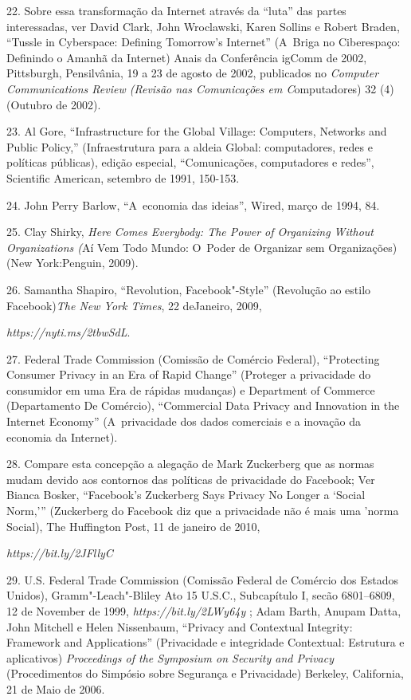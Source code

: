 \begin{Parskip}
22. Sobre essa transformação da Internet através da ``luta'' das partes
interessadas, ver David Clark, John Wroclawski, Karen Sollins e Robert
Braden, ``Tussle in Cyberspace: Defining Tomorrow's Internet'' (A~Briga
no Ciberespaço: Definindo o Amanhã da Internet) Anais da Conferência
igComm de 2002, Pittsburgh, Pensilvânia, 19 a 23 de agosto de 2002,
publicados no \emph{Computer Communications Review (Revisão nas
Comunicações em C}omputadores) 32 (4) (Outubro de 2002).

23. Al Gore, ``Infrastructure for the Global Village: Computers, Networks
and Public Policy,'' (Infraestrutura para a aldeia Global:
computadores, redes e políticas públicas), edição especial,
``Comunicações, computadores e redes'', Scientific American, setembro de
1991, 150-153.

24. John Perry Barlow, ``A~economia das ideias'', Wired, março de 1994, 84.

25. Clay Shirky, \emph{Here Comes Everybody: The Power of Organizing
Without Organizations (}Aí Vem Todo Mundo: O~Poder de Organizar sem
Organizações) (New York:Penguin, 2009).

26. Samantha Shapiro, ``Revolution, Facebook"-Style'' (Revolução ao estilo
Facebook)\emph{The New York Times}, 22 deJaneiro, 2009,

\emph{https://nyti.ms/2tbwSdL}.

27. Federal Trade Commission (Comissão de Comércio Federal), ``Protecting
Consumer Privacy in an Era of Rapid Change'' (Proteger a privacidade do
consumidor em uma Era de rápidas mudanças) e Department of Commerce
(Departamento De Comércio), ``Commercial Data Privacy and Innovation in
the Internet Economy'' (A~privacidade dos dados comerciais e a inovação
da economia da Internet).

28. Compare esta concepção a alegação de Mark Zuckerberg que as normas
mudam devido aos contornos das políticas de privacidade do Facebook; Ver
Bianca Bosker, ``Facebook's Zuckerberg Says Privacy No Longer a `Social
Norm,''' (Zuckerberg do Facebook diz que a privacidade não é mais uma
'norma Social), The Huffington Post, 11 de janeiro de 2010,

\emph{https://bit.ly/2JFllyC}

29. U.S. Federal Trade Commission (Comissão Federal de Comércio dos
Estados Unidos), Gramm"-Leach"-Bliley Ato 15 U.S.C., Subcapítulo I, secão
6801--6809, 12 de November de 1999,
\emph{https://bit.ly/2LWy64y}
; Adam Barth, Anupam Datta, John Mitchell e Helen Nissenbaum, ``Privacy
and Contextual Integrity: Framework and Applications'' (Privacidade e
integridade Contextual: Estrutura e aplicativos) \emph{Proceedings of
the  Symposium on Security and Privacy} (Procedimentos do Simpósio
sobre Segurança e Privacidade) Berkeley, California, 21 de Maio de 2006.


\end{Parskip}
